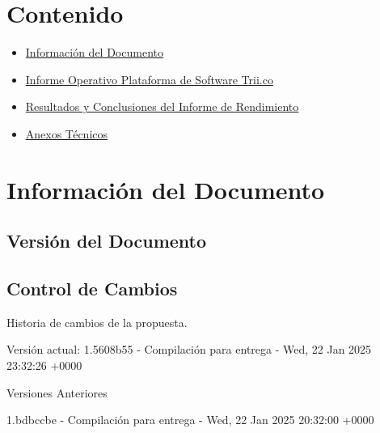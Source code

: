 \documentclass[
  paper=a4,
  ,captions=tableheading
]{scrartcl}
\providecommand{\tightlist}{%
  \setlength{\itemsep}{0pt}\setlength{\parskip}{0pt}}
\renewenvironment{quote}{\begin{customblockquote}\list{}{\rightmargin=0em\leftmargin=0em}%
\item\relax\color{blockquote-text}\ignorespaces}{\unskip\unskip\endlist\end{customblockquote}}
\begin{document}



\section{Contenido}\label{sec:contenido}

\begin{itemize}
\tightlist
\item
  \hyperref[informaciuxf3n-del-documento]{Información del Documento}
\item
  \hyperref[informe-operativo-plataforma-de-software-trii.co]{Informe
  Operativo Plataforma de Software Trii.co}
\item
  \hyperref[resultados-y-conclusiones-del-informe-de-rendimiento]{Resultados
  y Conclusiones del Informe de Rendimiento}
\item
  \hyperref[anexos-tuxe9cnicos]{Anexos Técnicos}
\end{itemize}

\newpage

\section{Información del
Documento}\label{sec:informaciuxf3n-del-documento}

\subsection{Versión del Documento}\label{sec:versiuxf3n-del-documento}

\begin{quote}
\end{quote}

\subsection{Control de Cambios}\label{sec:control-de-cambios}

Historia de cambios de la propuesta.

Versión actual: 1.5608b55 - Compilación para entrega - Wed, 22 Jan 2025
23:32:26 +0000

Versiones Anteriores

1.bdbccbe - Compilación para entrega - Wed, 22 Jan 2025 20:32:00 +0000
\end{document}
